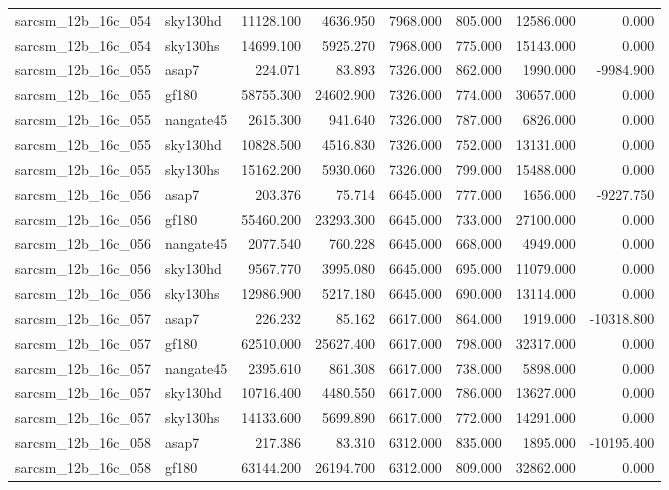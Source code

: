 \begin{tabular}{llrrrrrr}
sarcsm\_12b\_16c\_054 & sky130hd & 11128.100 & 4636.950 & 7968.000 & 805.000 & 12586.000 & 0.000 \\
sarcsm\_12b\_16c\_054 & sky130hs & 14699.100 & 5925.270 & 7968.000 & 775.000 & 15143.000 & 0.000 \\
sarcsm\_12b\_16c\_055 & asap7 & 224.071 & 83.893 & 7326.000 & 862.000 & 1990.000 & -9984.900 \\
sarcsm\_12b\_16c\_055 & gf180 & 58755.300 & 24602.900 & 7326.000 & 774.000 & 30657.000 & 0.000 \\
sarcsm\_12b\_16c\_055 & nangate45 & 2615.300 & 941.640 & 7326.000 & 787.000 & 6826.000 & 0.000 \\
sarcsm\_12b\_16c\_055 & sky130hd & 10828.500 & 4516.830 & 7326.000 & 752.000 & 13131.000 & 0.000 \\
sarcsm\_12b\_16c\_055 & sky130hs & 15162.200 & 5930.060 & 7326.000 & 799.000 & 15488.000 & 0.000 \\
sarcsm\_12b\_16c\_056 & asap7 & 203.376 & 75.714 & 6645.000 & 777.000 & 1656.000 & -9227.750 \\
sarcsm\_12b\_16c\_056 & gf180 & 55460.200 & 23293.300 & 6645.000 & 733.000 & 27100.000 & 0.000 \\
sarcsm\_12b\_16c\_056 & nangate45 & 2077.540 & 760.228 & 6645.000 & 668.000 & 4949.000 & 0.000 \\
sarcsm\_12b\_16c\_056 & sky130hd & 9567.770 & 3995.080 & 6645.000 & 695.000 & 11079.000 & 0.000 \\
sarcsm\_12b\_16c\_056 & sky130hs & 12986.900 & 5217.180 & 6645.000 & 690.000 & 13114.000 & 0.000 \\
sarcsm\_12b\_16c\_057 & asap7 & 226.232 & 85.162 & 6617.000 & 864.000 & 1919.000 & -10318.800 \\
sarcsm\_12b\_16c\_057 & gf180 & 62510.000 & 25627.400 & 6617.000 & 798.000 & 32317.000 & 0.000 \\
sarcsm\_12b\_16c\_057 & nangate45 & 2395.610 & 861.308 & 6617.000 & 738.000 & 5898.000 & 0.000 \\
sarcsm\_12b\_16c\_057 & sky130hd & 10716.400 & 4480.550 & 6617.000 & 786.000 & 13627.000 & 0.000 \\
sarcsm\_12b\_16c\_057 & sky130hs & 14133.600 & 5699.890 & 6617.000 & 772.000 & 14291.000 & 0.000 \\
sarcsm\_12b\_16c\_058 & asap7 & 217.386 & 83.310 & 6312.000 & 835.000 & 1895.000 & -10195.400 \\
sarcsm\_12b\_16c\_058 & gf180 & 63144.200 & 26194.700 & 6312.000 & 809.000 & 32862.000 & 0.000 \\

\end{tabular}
